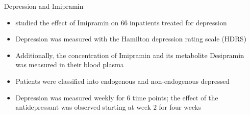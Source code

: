 \documentclass[aspectratio=169]{beamer}
\begin{document}
\begin{frame}{Depression and Imipramin \citep{ReisbyGram77}}
  \begin{itemize}
    \item \citet{ReisbyGram77} studied the effect of Imipramin on 66
      inpatients treated for depression
    \item Depression was measured with the Hamilton depression rating scale
      (HDRS)
    \item Additionally, the concentration of Imipramin and its metabolite
      Desipramin was measured in their blood plasma
    \item Patients were classified into endogenous and non-endogenous
      depressed
    \item Depression was measured weekly for 6 time points; the effect of
      the antidepressant was observed starting at week 2 for four weeks
  \end{itemize}
\end{frame}
\end{document}
